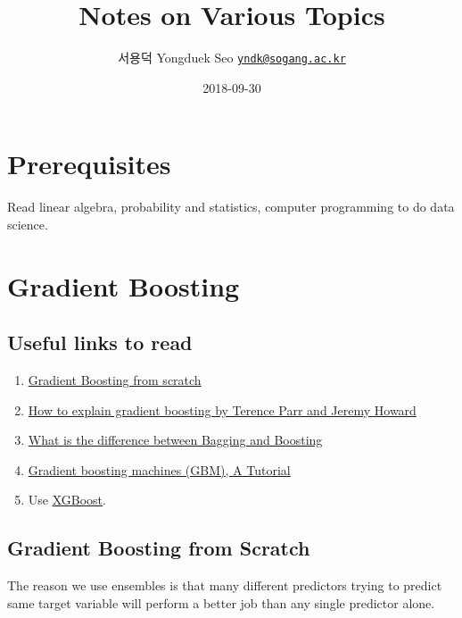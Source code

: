 \documentclass[]{book}
\title{Notes on Various Topics}
\author{서용덕 Yongduek Seo
\href{mailto:yndk@sogang.ac.kr}{\nolinkurl{yndk@sogang.ac.kr}}}
\date{2018-09-30}
\theoremstyle{definition}
\theoremstyle{definition}
\theoremstyle{definition}
\theoremstyle{remark}
\begin{document}
\maketitle

{
\setcounter{tocdepth}{1}
\tableofcontents
}
\chapter{Prerequisites}\label{prerequisites}

Read linear algebra, probability and statistics, computer programming to
do data science.

\chapter{Gradient Boosting}\label{gradient-boosting}

\section{Useful links to read}\label{useful-links-to-read}

\begin{enumerate}
\def\labelenumi{\arabic{enumi}.}
\item
  \href{https://medium.com/mlreview/gradient-boosting-from-scratch-1e317ae4587d}{Gradient
  Boosting from scratch}
\item
  \href{http://explained.ai/gradient-boosting/index.html}{How to explain
  gradient boosting by Terence Parr and Jeremy Howard}
\item
  \href{https://quantdare.com/what-is-the-difference-between-bagging-and-boosting/}{What
  is the difference between Bagging and Boosting}
\item
  \href{https://www.ncbi.nlm.nih.gov/pmc/articles/PMC3885826/}{Gradient
  boosting machines (GBM), A Tutorial}
\item
  Use \href{https://xgboost.ai/}{XGBoost}.
\end{enumerate}

\section{Gradient Boosting from
Scratch}\label{gradient-boosting-from-scratch}

The reason we use ensembles is that many different predictors trying to
predict same target variable will perform a better job than any single
predictor alone.
\end{document}

